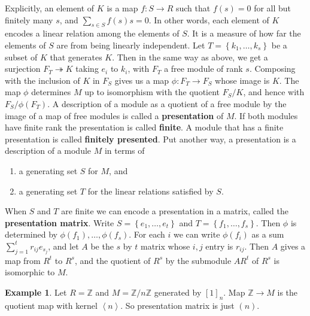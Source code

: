 \documentclass{article}
\newcommand{\Z}{\mathbb{Z}}
\newcommand{\rb}[1]{\left( #1 \right)}
\renewcommand{\sb}[1]{\left[ #1 \right]}
\newcommand{\cb}[1]{\left\{ #1 \right\}}
\newcommand{\ab}[1]{\left\langle #1 \right\rangle}
\theoremstyle{definition}\newtheorem{definition}{Definition}[subsection]
\theoremstyle{definition}\newtheorem{remark}[definition]{Remark}
\theoremstyle{definition}\newtheorem*{example}{Example}
\theoremstyle{definition}\newtheorem*{note}{Note}
\begin{document}
Explicitly, an element of $ K $ is a map $ f : S \to R $ such that $ f\rb{s} = 0 $ for all but finitely many $ s $, and $ \sum_{s \in S} f\rb{s}s = 0 $. In other words, each element of $ K $ encodes a linear relation among the elements of $ S $. It is a measure of how far the elements of $ S $ are from being linearly independent. Let $ T = \cb{k_1, \dots, k_s} $ be a subset of $ K $ that generates $ K $. Then in the same way as above, we get a surjection $ F_T \twoheadrightarrow K $ taking $ e_i $ to $ k_i $, with $ F_T $ a free module of rank $ s $. Composing with the inclusion of $ K $ in $ F_S $ gives us a map $ \phi : F_T \to F_S $ whose image is $ K $. The map $ \phi $ determines $ M $ up to isomorphism with the quotient $ F_S / K $, and hence with $ F_S / \phi\rb{F_T} $. A description of a module as a quotient of a free module by the image of a map of free modules is called a \textbf{presentation} of $ M $. If both modules have finite rank the presentation is called \textbf{finite}. A module that has a finite presentation is called \textbf{finitely presented}. Put another way, a presentation is a description of a module $ M $ in terms of
\begin{enumerate}
\item a generating set $ S $ for $ M $, and
\item a generating set $ T $ for the linear relations satisfied by $ S $.
\end{enumerate}
When $ S $ and $ T $ are finite we can encode a presentation in a matrix, called the \textbf{presentation matrix}. Write $ S = \cb{e_1, \dots, e_t} $ and $ T = \cb{f_1, \dots, f_s} $. Then $ \phi $ is determined by $ \phi\rb{f_1}, \dots, \phi\rb{f_s} $. For each $ i $ we can write $ \phi\rb{f_i} $ as a sum $ \sum_{j = 1}^t r_{ij}e_{s_j} $, and let $ A $ be the $ s $ by $ t $ matrix whose $ i, j $ entry is $ r_{ij} $. Then $ A $ gives a map from $ R^t $ to $ R^s $, and the quotient of $ R^s $ by the submodule $ AR^t $ of $ R^s $ is isomorphic to $ M $.

\begin{example}
Let $ R = \Z $ and $ M = \Z / n\Z $ generated by $ \sb{1}_n $. Map $ \Z \to M $ is the quotient map with kernel $ \ab{n} $. So presentation matrix is just $ \rb{n} $.
\end{example}
\end{document}
